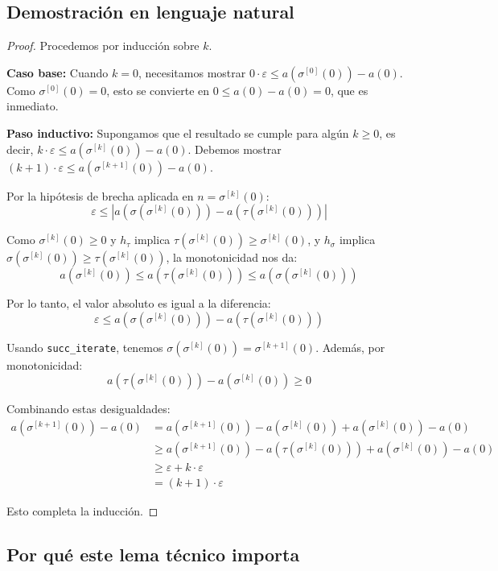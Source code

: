 \subsection{Demostración en lenguaje natural}

\begin{proof}
Procedemos por inducción sobre $k$.

\textbf{Caso base:} Cuando $k = 0$, necesitamos mostrar
$0 \cdot \varepsilon \leq a(\sigma^{[0]}(0)) - a(0)$. Como
$\sigma^{[0]}(0) = 0$, esto se convierte en $0 \leq a(0) - a(0) = 0$, que
es inmediato.

\textbf{Paso inductivo:} Supongamos que el resultado se cumple para algún
$k \geq 0$, es decir,
$k \cdot \varepsilon \leq a(\sigma^{[k]}(0)) - a(0)$.
Debemos mostrar $(k+1) \cdot \varepsilon \leq a(\sigma^{[k+1]}(0)) - a(0)$.

Por la hipótesis de brecha aplicada en $n = \sigma^{[k]}(0)$:
\[
  \varepsilon \leq |a(\sigma(\sigma^{[k]}(0))) - a(\tau(\sigma^{[k]}(0)))|
\]

Como $\sigma^{[k]}(0) \geq 0$ y $h_\tau$ implica
$\tau(\sigma^{[k]}(0)) \geq \sigma^{[k]}(0)$, y $h_\sigma$ implica
$\sigma(\sigma^{[k]}(0)) \geq \tau(\sigma^{[k]}(0))$, la monotonicidad
nos da:
\[
  a(\sigma^{[k]}(0)) \leq a(\tau(\sigma^{[k]}(0))) \leq a(\sigma(\sigma^{[k]}(0)))
\]

Por lo tanto, el valor absoluto es igual a la diferencia:
\[
  \varepsilon \leq a(\sigma(\sigma^{[k]}(0))) - a(\tau(\sigma^{[k]}(0)))
\]

Usando \texttt{succ\_iterate}, tenemos
$\sigma(\sigma^{[k]}(0)) = \sigma^{[k+1]}(0)$.
Además, por monotonicidad:
\[
  a(\tau(\sigma^{[k]}(0))) - a(\sigma^{[k]}(0)) \geq 0
\]

Combinando estas desigualdades:
\begin{align*}
  a(\sigma^{[k+1]}(0)) - a(0)
    &= a(\sigma^{[k+1]}(0)) - a(\sigma^{[k]}(0)) + a(\sigma^{[k]}(0)) - a(0) \\
    &\geq a(\sigma^{[k+1]}(0)) - a(\tau(\sigma^{[k]}(0))) + a(\sigma^{[k]}(0)) - a(0) \\
    &\geq \varepsilon + k \cdot \varepsilon \\
    &= (k+1) \cdot \varepsilon
\end{align*}

Esto completa la inducción.
\end{proof}

\subsection{Por qué este lema técnico importa}

